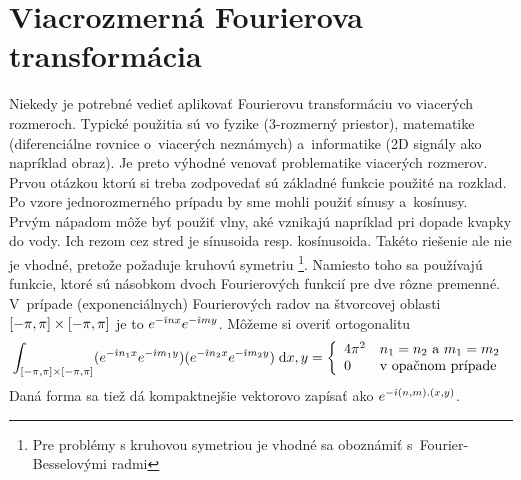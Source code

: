 \section{Viacrozmerná Fourierova transformácia}

Niekedy je potrebné vedieť aplikovať Fourierovu transformáciu vo
viacerých rozmeroch. Typické použitia sú vo fyzike (3-rozmerný
priestor), matematike (diferenciálne rovnice o~viacerých neznámych) 
a~informatike (2D signály ako napríklad obraz). Je preto výhodné venovať
problematike viacerých rozmerov. Prvou otázkou ktorú si
treba zodpovedať sú základné funkcie použité na rozklad. Po vzore
jednorozmerného prípadu by sme mohli použiť sínusy a~kosínusy. Prvým
nápadom môže byť použiť vlny, aké vznikajú napríklad pri dopade kvapky
do vody. Ich rezom cez stred je sínusoida resp. kosínusoida. Takéto
riešenie ale nie je vhodné, pretože požaduje kruhovú
symetriu \footnote{Pre problémy s kruhovou symetriou je vhodné sa
oboznámiť s~Fourier-Besselovými radmi}. Namiesto toho sa používajú
funkcie, ktoré sú násobkom dvoch Fourierových funkcií pre dve rôzne
premenné. V~prípade (exponenciálnych) Fourierových radov na štvorcovej oblasti
$[-\pi,\pi]\times[-\pi,\pi]$ je to
$e^{-\hat{\imath} n x} e^{-\hat{\imath} m y}$. Môžeme si overiť ortogonalitu
\begin{equation*}
 \int_{[-\pi,\pi]\times[-\pi,\pi]} (e^{-\hat{\imath} n_1 x} e^{-\hat{\imath} m_1 y}) 
      (e^{-\hat{\imath} n_2 x} e^{-\hat{\imath} m_2 y}) \; \mathrm{d} x,y =
    \left\{
        \begin{array}{l l}
            4\pi^2& n_1 = n_2\text{ a }m_1 = m_2\\
            0& \text{v opačnom prípade}
        \end{array}
    \right.
\end{equation*}
Daná forma sa tiež dá kompaktnejšie vektorovo zapísať ako 
$e^{-\hat{\imath} (n,m).(x,y)}$.


